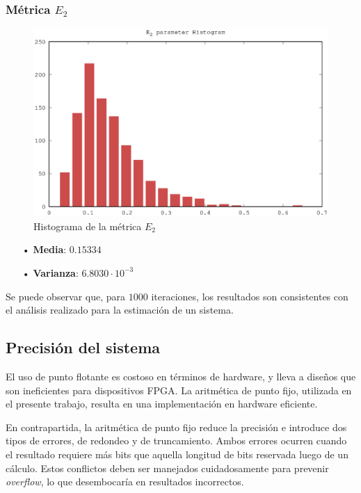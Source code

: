 \subsubsection{Métrica $E_2$}

\vspace{-0.5cm}

\begin{figure}[htb!]
    \centering
        \includegraphics[width = 10 cm]{./figures/C05-multiple_system_e2_hist}
        \caption{Histograma de la métrica $E_2$}
        \label{fig:multiple_system_e2_hist}
\end{figure}

\vspace{-0.5cm}

\begin{itemize}
   \item[•] \textbf{Media}: $0.15334$ 
   \item[•] \textbf{Varianza}: $6.8030 \cdot 10^{-3}$
\end{itemize}

Se puede observar que, para $1000$ iteraciones, los resultados son consistentes con el análisis realizado para la estimación de un sistema.

\subsection{Precisión del sistema}
\label{sec:precision_del_sistema}

El uso de punto flotante es costoso en términos de hardware, y lleva a diseños que son ineficientes para dispositivos FPGA. La aritmética de punto fijo, utilizada en el presente trabajo, resulta en una implementación en hardware eficiente.

En contrapartida, la aritmética de punto fijo reduce la precisión e introduce dos tipos de errores, de redondeo y de truncamiento. Ambos errores ocurren cuando el resultado requiere más bits que aquella longitud de bits reservada luego de un cálculo. Estos conflictos deben ser manejados cuidadosamente para prevenir \textit{overflow}, lo que desembocaría en resultados incorrectos.

